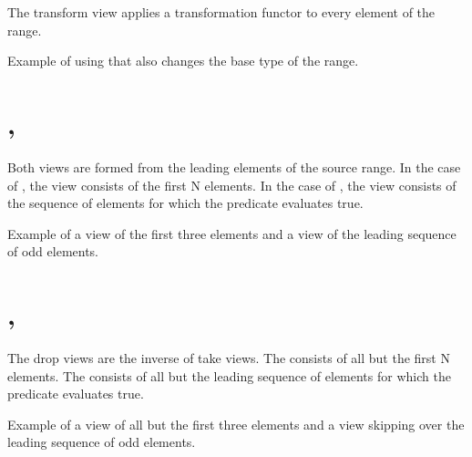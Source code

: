 The transform view applies a transformation functor to every element of the range.

\begin{codebox}[]{\href{https://compiler-explorer.com/z/qanMb3GqG}{\ExternalLink}}
\footnotesize Example of using  that also changes the base type of the range.
\tcblower
{}
\end{codebox}

\section{\texorpdfstring{, }{\texttt{std::views::take}, \texttt{std::views::take\_while}}}

Both views are formed from the leading elements of the source range. In the case of , the view consists of the first N elements. In the case of , the view consists of the sequence of elements for which the predicate evaluates true.

\begin{codebox}[]{\href{https://compiler-explorer.com/z/6vavoW6T3}{\ExternalLink}}
\footnotesize Example of a view of the first three elements and a view of the leading sequence of odd elements.
\tcblower
{}
\end{codebox}

\section{\texorpdfstring{, }{\texttt{std::views::drop}, \texttt{std::views::drop\_while}}}

The drop views are the inverse of take views.
The  consists of all but the first N elements.
The  consists of all but the leading sequence of elements for which the predicate evaluates true.

\begin{codebox}[]{\href{https://compiler-explorer.com/z/Yn9PKe1aY}{\ExternalLink}}
\footnotesize Example of a view of all but the first three elements and a view skipping over the leading sequence of odd elements.
\tcblower
{}
\end{codebox}

